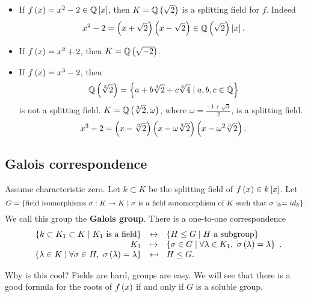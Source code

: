 \begin{example}
\hfill
\begin{itemize}
\item If $ f\left( x \right) = x^2 - 2 \in \mathbb{Q}\left[ x \right] $, then $ K = \mathbb{Q}\left( \sqrt{2} \right) $ is a splitting field for $ f $. Indeed
$$ x^2 - 2 =\left( x + \sqrt{2} \right)\left( x - \sqrt{2} \right) \in \mathbb{Q}\left( \sqrt{2} \right)\left[ x \right]. $$
\item If $ f\left( x \right) = x^2 + 2 $, then $ K = \mathbb{Q}\left( \sqrt{-2} \right) $.
\item If $ f\left( x \right) = x^3 - 2 $, then
$$ \mathbb{Q}\left( \sqrt[3]{2} \right) = \left\{ a + b\sqrt[3]{2} + c\sqrt[3]{4} \mid a, b, c \in \mathbb{Q} \right\} $$
is not a splitting field. $ K = \mathbb{Q}\left( \sqrt[3]{2}, \omega \right) $, where $ \omega = \tfrac{-1 + \sqrt{3}}{2} $, is a splitting field.
$$ x^3 - 2 = \left( x - \sqrt[3]{2} \right)\left( x - \omega\sqrt[3]{2} \right)\left( x - \omega^2\sqrt[3]{2} \right). $$
\end{itemize}
\end{example}

\subsection{Galois correspondence}

\begin{theorem}
\label{thm:galoiscorrespondence}
Assume characteristic zero. Let $ k \subset K $ be the splitting field of $ f\left( x \right) \in k\left[ x \right] $. Let
$$ G = \left\{ \text{field isomorphisms} \ \sigma : K \to K \mid \sigma \ \text{is a field automorphism of} \ K \ \text{such that} \ \sigma\mid_{k} = id_k \right\}. $$
We call this group the \textbf{Galois group}. There is a one-to-one correspondence
$$
\begin{array}{rcl}
\cb{k \subset K_1 \subset K \mid K_1 \ \text{is a field}} & \leftrightarrow & \cb{H \le G \mid H \ \text{a subgroup}} \\
K_1 & \mapsto & \cb{\sigma \in G \mid \forall \lambda \in K_1, \ \sigma\rb{\lambda} = \lambda} \\
\cb{\lambda \in K \mid \forall \sigma \in H, \ \sigma\rb{\lambda} = \lambda} & \mapsfrom & H \le G.
\end{array}.
$$
\end{theorem}

Why is this cool? Fields are hard, groups are easy. We will see that there is a good formula for the roots of $ f\left( x \right) $ if and only if $ G $ is a soluble group.


